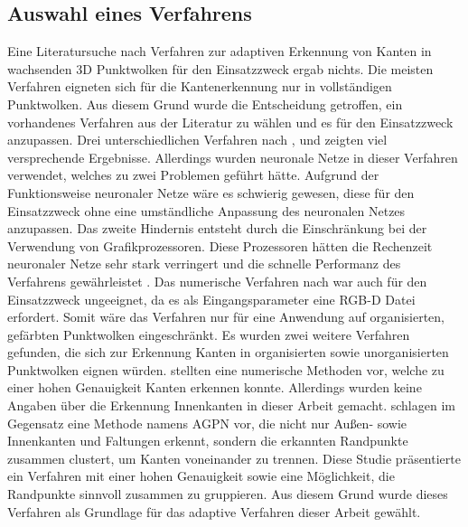 \subsection{Auswahl eines Verfahrens}
Eine Literatursuche nach Verfahren zur adaptiven Erkennung von Kanten in wachsenden 3D Punktwolken für den Einsatzzweck ergab nichts. Die meisten Verfahren eigneten sich für die Kantenerkennung nur in vollständigen Punktwolken. Aus diesem Grund wurde die Entscheidung getroffen, ein vorhandenes Verfahren aus der Literatur zu wählen und es für den Einsatzzweck anzupassen. Drei unterschiedlichen Verfahren nach \textcite{bazazian_edc-net_2021}, \textcite{himeur_pcednet_2021} und \textcite{rachmadi_road_2017} zeigten viel versprechende Ergebnisse. Allerdings wurden neuronale Netze in dieser Verfahren verwendet, welches zu zwei Problemen geführt hätte. Aufgrund der Funktionsweise neuronaler Netze wäre es schwierig gewesen, diese für den Einsatzzweck ohne eine umständliche Anpassung des neuronalen Netzes anzupassen. Das zweite Hindernis entsteht durch die Einschränkung bei der Verwendung von Grafikprozessoren. Diese Prozessoren hätten die Rechenzeit neuronaler Netze sehr stark verringert und die schnelle Performanz des Verfahrens gewährleistet \autocite[625]{luo_artificial_2005}. Das numerische Verfahren nach \textcite{choi_rgb-d_2013} war auch für den Einsatzzweck ungeeignet, da es als Eingangsparameter eine RGB-D Datei erfordert. Somit wäre das Verfahren nur für eine Anwendung auf organisierten, gefärbten Punktwolken eingeschränkt. Es wurden zwei weitere Verfahren gefunden, die sich zur Erkennung Kanten in organisierten sowie unorganisierten Punktwolken eignen würden. \textcite{mineo_novel_2019} stellten eine numerische Methoden vor, welche zu einer hohen Genauigkeit Kanten erkennen konnte. Allerdings wurden keine Angaben über die Erkennung Innenkanten in dieser Arbeit gemacht. \textcite{ni_edge_2016} schlagen im Gegensatz eine Methode namens AGPN vor, die nicht nur Außen- sowie Innenkanten und Faltungen erkennt, sondern die erkannten Randpunkte zusammen clustert, um Kanten voneinander zu trennen. Diese Studie präsentierte ein Verfahren mit einer hohen Genauigkeit sowie eine Möglichkeit, die Randpunkte sinnvoll zusammen zu gruppieren. Aus diesem Grund wurde dieses Verfahren als Grundlage für das adaptive Verfahren dieser Arbeit gewählt.

